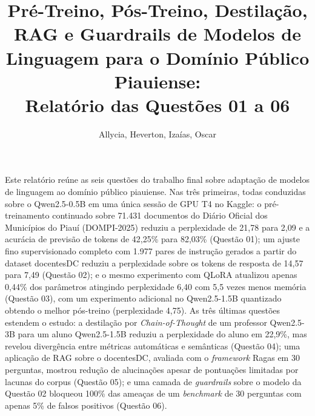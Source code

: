 \documentclass[12pt]{article}
\title{Pré-Treino, Pós-Treino, Destilação, RAG e Guardrails de Modelos de Linguagem para o Domínio Público Piauiense:\\ Relatório das Questões 01 a 06}
\author{Allycia, Heverton, Izaías, Oscar\inst{1}}
\begin{document}
\maketitle

\begin{resumo}
  Este relatório reúne as seis questões do trabalho final sobre adaptação de modelos de linguagem ao domínio público piauiense. Nas três primeiras, todas conduzidas sobre o Qwen2.5-0.5B em uma única sessão de GPU T4 no Kaggle: o pré-treinamento continuado sobre 71.431 documentos do Diário Oficial dos Municípios do Piauí (DOMPI-2025) reduziu a perplexidade de 21,78 para 2,09 e a acurácia de previsão de tokens de 42,25\% para 82,03\% (Questão 01); um ajuste fino supervisionado completo com 1.977 pares de instrução gerados a partir do dataset docentesDC reduziu a perplexidade sobre os tokens de resposta de 14,57 para 7,49 (Questão 02); e o mesmo experimento com QLoRA atualizou apenas 0,44\% dos parâmetros atingindo perplexidade 6,40 com 5,5 vezes menos memória (Questão 03), com um experimento adicional no Qwen2.5-1.5B quantizado obtendo o melhor pós-treino (perplexidade 4,75). As três últimas questões estendem o estudo: a destilação por \textit{Chain-of-Thought} de um professor Qwen2.5-3B para um aluno Qwen2.5-1.5B reduziu a perplexidade do aluno em 22,9\%, mas revelou divergência entre métricas automáticas e semânticas (Questão 04); uma aplicação de RAG sobre o docentesDC, avaliada com o \textit{framework} Ragas em 30 perguntas, mostrou redução de alucinações apesar de pontuações limitadas por lacunas do corpus (Questão 05); e uma camada de \textit{guardrails} sobre o modelo da Questão 02 bloqueou 100\% das ameaças de um \textit{benchmark} de 30 perguntas com apenas 5\% de falsos positivos (Questão 06).
\end{resumo}















\end{document}
